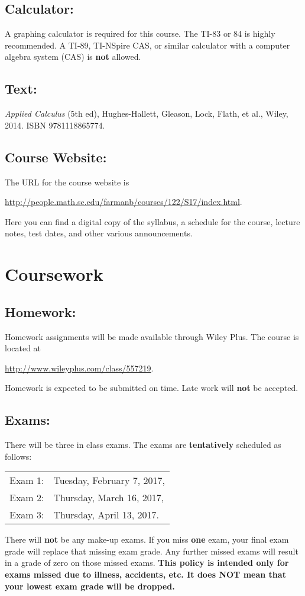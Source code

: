 \documentclass[10pt]{amsart}
\begin{document}
\subsection*{Calculator:}
A graphing calculator is required for this course.
The TI-83 or 84 is highly recommended.
A TI-89, TI-NSpire CAS, or similar calculator with a computer algebra system (CAS) is \textbf{not} allowed.

\subsection*{Text:} 
\textit{Applied Calculus} (5th ed), Hughes-Hallett, Gleason, Lock, Flath, et al., Wiley, 2014.  ISBN 9781118865774.
\subsection*{Course Website:} 
The URL for the course website is
\begin{center}
  \url{http://people.math.sc.edu/farmanb/courses/122/S17/index.html}.
\end{center}
Here you can find a digital copy of the syllabus, a schedule for the course, lecture notes, test dates, and other various announcements.

\newpage

\section*{Coursework}
\noindent
\subsection*{Homework:} 
Homework assignments will be made available through Wiley Plus.
The course is located at
\begin{center}
  \url{http://www.wileyplus.com/class/557219}.
\end{center}
Homework is expected to be submitted on time.
Late work will \textbf{not} be accepted.
\subsection*{Exams:} 
There will be three in class exams.
The exams are \textbf{tentatively} scheduled as follows:
\begin{center}
  \begin{tabular}{ll}
    Exam 1: & Tuesday, February 7, 2017,\\
    Exam 2: & Thursday, March 16, 2017,\\
    Exam 3: & Thursday, April 13, 2017.
  \end{tabular}
\end{center}
\noindent
There will \textbf{not} be any make-up exams.
If you miss \textbf{one} exam, your final exam grade will replace that missing exam grade.
Any further missed exams will result in a grade of zero on those missed exams.
\textbf{This policy is intended only for exams missed due to illness, accidents, etc.  
  It does NOT mean that your lowest exam grade will be dropped.}
\end{document}
